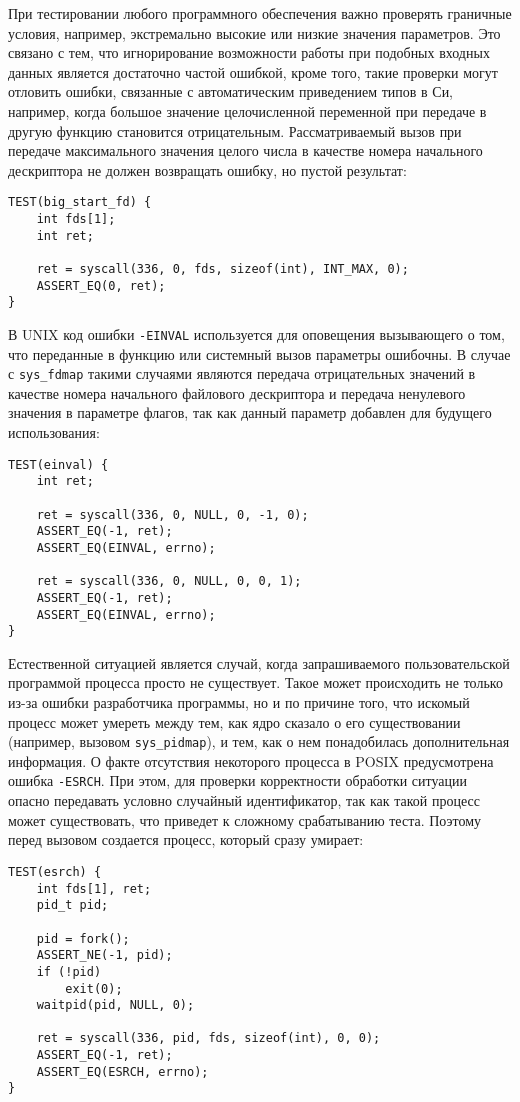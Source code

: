 При тестировании любого программного обеспечения важно проверять граничные
условия, например, экстремально высокие или низкие значения параметров. Это
связано с тем, что игнорирование возможности работы при подобных входных данных
является достаточно частой ошибкой, кроме того, такие проверки могут отловить
ошибки, связанные с автоматическим приведением типов в Си, например, когда
большое значение целочисленной переменной при передаче в другую функцию
становится отрицательным. Рассматриваемый вызов при передаче максимального
значения целого числа в качестве номера начального дескриптора не должен
возвращать ошибку, но пустой результат:
\medskip
\begin{lstlisting}[style=cstyle]
TEST(big_start_fd) {
	int fds[1];
	int ret;

	ret = syscall(336, 0, fds, sizeof(int), INT_MAX, 0);
	ASSERT_EQ(0, ret);
}
\end{lstlisting}
\medskip

В UNIX код ошибки \texttt{-EINVAL} используется для оповещения вызывающего о
том, что переданные в функцию или системный вызов параметры ошибочны. В случае с
\texttt{sys\_fdmap} такими случаями являются передача отрицательных значений в
качестве номера начального файлового дескриптора и передача ненулевого значения
в параметре флагов, так как данный параметр добавлен для будущего использования:
\medskip
\begin{lstlisting}[style=cstyle]
TEST(einval) {
	int ret;

	ret = syscall(336, 0, NULL, 0, -1, 0);
	ASSERT_EQ(-1, ret);
	ASSERT_EQ(EINVAL, errno);

	ret = syscall(336, 0, NULL, 0, 0, 1);
	ASSERT_EQ(-1, ret);
	ASSERT_EQ(EINVAL, errno);
}
\end{lstlisting}
\medskip

Естественной ситуацией является случай, когда запрашиваемого пользовательской
программой процесса просто не существует. Такое может происходить не только
из-за ошибки разработчика программы, но и по причине того, что искомый процесс
может умереть между тем, как ядро сказало о его существовании (например, вызовом
\texttt{sys\_pidmap}), и тем, как о нем понадобилась дополнительная информация.
О факте отсутствия некоторого процесса в POSIX предусмотрена ошибка
\texttt{-ESRCH}. При этом, для проверки корректности обработки ситуации опасно
передавать условно случайный идентификатор, так как такой процесс может
существовать, что приведет к сложному срабатыванию теста. Поэтому перед вызовом
создается процесс, который сразу умирает:
\medskip
\begin{lstlisting}[style=cstyle]
TEST(esrch) {
	int fds[1], ret;
	pid_t pid;

	pid = fork();
	ASSERT_NE(-1, pid);
	if (!pid)
		exit(0);
	waitpid(pid, NULL, 0);

	ret = syscall(336, pid, fds, sizeof(int), 0, 0);
	ASSERT_EQ(-1, ret);
	ASSERT_EQ(ESRCH, errno);
}
\end{lstlisting}
\medskip

